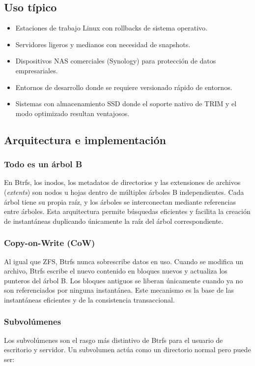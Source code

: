 \documentclass[12pt,letterpaper]{article}
\begin{document}
\subsection{Uso típico}
\begin{itemize}
\item Estaciones de trabajo Linux con rollbacks de sistema operativo.
\item Servidores ligeros y medianos con necesidad de snapshots.
\item Dispositivos NAS comerciales (Synology) para protección de datos empresariales.
\item Entornos de desarrollo donde se requiere versionado rápido de entornos.
\item Sistemas con almacenamiento SSD donde el soporte nativo de TRIM y el modo optimizado resultan ventajosos.
\end{itemize}

\subsection{Arquitectura e implementación}

\subsubsection{Todo es un árbol B}
En Btrfs, los inodos, los metadatos de directorios y las extensiones de archivos (\emph{extents}) son nodos u
hojas dentro de múltiples árboles B independientes. Cada árbol tiene su propia raíz, y los árboles se
interconectan mediante referencias entre árboles. Esta arquitectura permite búsquedas eficientes y facilita la
creación de instantáneas duplicando únicamente la raíz del árbol correspondiente.

\subsubsection{Copy-on-Write (CoW)}
Al igual que ZFS, Btrfs nunca sobrescribe datos en uso. Cuando se modifica un archivo, Btrfs escribe el nuevo
contenido en bloques nuevos y actualiza los punteros del árbol B. Los bloques antiguos se liberan únicamente
cuando ya no son referenciados por ninguna instantánea. Este mecanismo es la base de las instantáneas eficientes
y de la consistencia transaccional.

\subsubsection{Subvolúmenes}
Los subvolúmenes son el rasgo más distintivo de Btrfs para el usuario de escritorio y servidor. Un subvolumen
actúa como un directorio normal pero puede ser:
\end{document}
